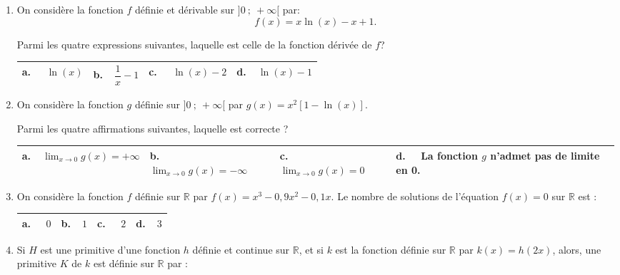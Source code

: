 \documentclass[11pt]{article}
\newcommand{\R}{\mathbb{R}}
\begin{document}
\begin{enumerate}
\item On considère la fonction $f$ définie et dérivable sur $]0~;~+\infty[$ par:
\[f(x) = x \ln(x) - x + 1.\]

Parmi les quatre expressions suivantes, laquelle est celle de la fonction dérivée de $f$?

\begin{center}
\begin{tabularx}{\linewidth}{|*{4}{X|}}\hline
\textbf{a.~~} $\ln (x)$&\textbf{b.~~}$\dfrac{1}{x} - 1$&\textbf{c.~~} $\ln (x) - 2$&\textbf{d.~~}$\ln (x) - 1$\rule[-3mm]{0mm}{9mm}\\ \hline
\end{tabularx}
\end{center}

\item On considère la fonction $g$ définie sur $]0~;~+\infty[$ par $g(x) = x^2[1 - \ln (x)]$.

 Parmi les quatre affirmations suivantes, laquelle est correcte ?
 
\begin{center}
\begin{tabularx}{\linewidth}{|*{4}{X|}}\hline
\textbf{a.~~}$\displaystyle\lim_{x \to 0} g(x) = +\infty$&\textbf{b.~~} 
$\displaystyle\lim_{x \to 0} g(x) = - \infty$&\textbf{c.~~} $\displaystyle\lim_{x \to 0} g(x) = 0$&\textbf{d.~~} La fonction $g$ n'admet pas de limite en 0.\\ \hline
\end{tabularx}
\end{center}

\item On considère la fonction $f$ définie sur $\R$ par $f(x) = x^3 - 0,9x^2 -0,1x$. Le nombre de solutions de l'équation $f(x) = 0$ sur $\R$ est :

\begin{center}
\begin{tabularx}{\linewidth}{|*{4}{X|}}\hline
\textbf{a.~~} $0$&\textbf{b.~~}$1$&\textbf{c.~~} $2$&\textbf{d.~~}$3$\\ \hline
\end{tabularx}
\end{center}

\item Si $H$ est une primitive d'une fonction $h$ définie et continue sur $\R$, 
et si $k$ est la fonction définie sur $\R$ par $k(x) = h(2x)$, 
alors, une primitive $K$ de $k$ est définie sur $\R$ par :


\end{enumerate}
\end{document}
